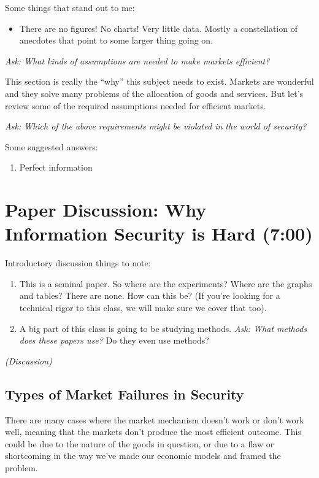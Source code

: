 \documentclass[11pt]{article}
\begin{document}
Some things that stand out to me:

\begin{itemize}
    \item There are no figures! No charts! Very little data. Mostly a constellation of anecdotes that point to some larger thing going on.
\end{itemize}

{\it Ask: What kinds of assumptions are needed to make markets efficient?}


This section is really the ``why'' this subject needs to exist. 
Markets are wonderful and they solve many problems of the allocation of goods and services.
But let's review some of the required assumptions needed for efficient markets.

{\it Ask: Which of the above requirements might be violated in the world of security?}

Some suggested answers:
\begin{enumerate}
    \item Perfect information
\end{enumerate}

\section{Paper Discussion: Why Information Security is Hard (7:00)}


Introductory discussion things to note:
\begin{enumerate}
    \item This is a seminal paper. So where are the experiments? Where are the graphs and tables? There are none. How can this be? (If you're looking for a technical rigor to this class, we will make sure we cover that too).
    \item A big part of this class is going to be studying methods. {\it Ask: What methods does these papers use?} Do they even use methods?
\end{enumerate}

{\it (Discussion)}


\subsection{Types of Market Failures in Security}

There are many cases where the market mechanism doesn't work or don't work well, meaning that the markets don't  produce the most efficient outcome. This could be due to the nature of the goods in question, or due to a flaw or shortcoming in the way we've made our economic models and framed the problem.
\end{document}
